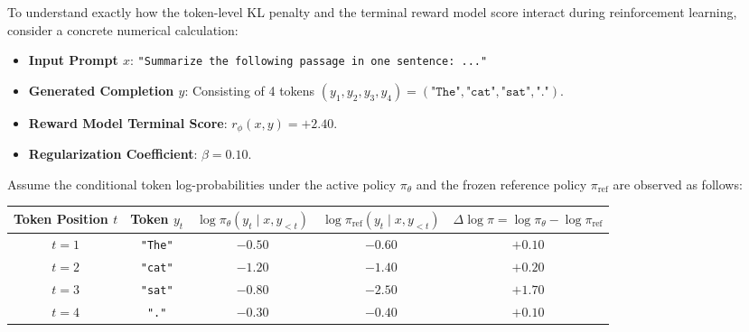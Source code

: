 \documentclass[../../main.tex]{subfiles}
\begin{document}
\begin{tcolorbox}[colback=cardBg,colframe=cardLine,arc=2pt,boxrule=0.5pt,title=\textbf{Pedagogical Walkthrough: PPO Regularized Reward Calculation with Concrete Numbers}]
\label{box:ppo_reward_numerical_walkthrough}
To understand exactly how the token-level KL penalty and the terminal reward model score interact during reinforcement learning, consider a concrete numerical calculation:
\begin{itemize}
    \item \textbf{Input Prompt $x$}: \texttt{"Summarize the following passage in one sentence: ..."}
    \item \textbf{Generated Completion $y$}: Consisting of 4 tokens $(y_1, y_2, y_3, y_4) = (\texttt{"The"}, \texttt{"cat"}, \texttt{"sat"}, \texttt{"."})$.
    \item \textbf{Reward Model Terminal Score}: $r_\phi(x, y) = +2.40$.
    \item \textbf{Regularization Coefficient}: $\beta = 0.10$.
\end{itemize}

Assume the conditional token log-probabilities under the active policy $\pi_\theta$ and the frozen reference policy $\pi_{\text{ref}}$ are observed as follows:
\begin{center}
\small\sffamily
\begin{tabular}{ccccc}
\toprule
\textbf{Token Position $t$} & \textbf{Token $y_t$} & $\log \pi_\theta(y_t \mid x, y_{<t})$ & $\log \pi_{\text{ref}}(y_t \mid x, y_{<t})$ & $\Delta \log \pi = \log \pi_\theta - \log \pi_{\text{ref}}$ \\
\midrule
$t=1$ & \texttt{"The"} & $-0.50$ & $-0.60$ & $+0.10$ \\
$t=2$ & \texttt{"cat"} & $-1.20$ & $-1.40$ & $+0.20$ \\
$t=3$ & \texttt{"sat"} & $-0.80$ & $-2.50$ & $+1.70$ \\
$t=4$ & \texttt{"."}   & $-0.30$ & $-0.40$ & $+0.10$ \\
\bottomrule
\end{tabular}
\end{center}


\end{tcolorbox}
\end{document}
